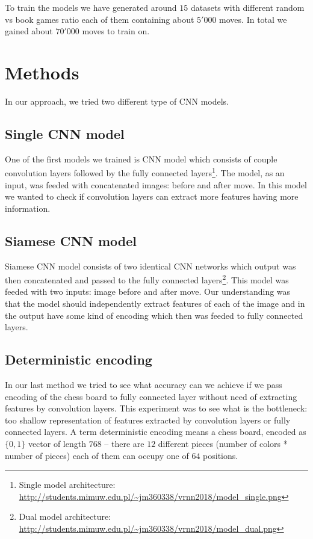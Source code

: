 \documentclass[10pt,twocolumn,letterpaper]{article}
\begin{document}
To train the models we have generated around $15$ datasets with different random
vs book games ratio each of them containing about $5'000$ moves. In total we
gained about $70'000$ moves to train on.

\section{Methods}

In our approach, we tried two different type of CNN models.

\subsection{Single CNN model}

One of the first models we trained is CNN model which consists of couple
convolution layers followed by the fully connected layers\footnote{Single model
architecture:
\url{http://students.mimuw.edu.pl/~jm360338/vrnn2018/model_single.png}}. The
model, as an input, was feeded with concatenated images: before and after move.
In this model we wanted to check if convolution layers can extract more features
having more information.

\subsection{Siamese CNN model}

Siamese CNN model consists of two identical CNN networks which output was then
concatenated and passed to the fully connected layers\footnote{Dual model
architecture:
\url{http://students.mimuw.edu.pl/~jm360338/vrnn2018/model_dual.png}}. This
model was feeded with two inputs: image before and after move. Our understanding
was that the model should independently extract features of each of the image
and in the output have some kind of encoding which then was feeded to fully
connected layers.

\subsection{Deterministic encoding}

In our last method we tried to see what accuracy can we achieve if we pass
encoding of the chess board to fully connected layer without need of extracting
features by convolution layers. This experiment was to see what is the
bottleneck: too shallow representation of features extracted by convolution
layers or fully connected layers. A term deterministic encoding means a chess
board, encoded as $\{0,1\}$ vector of length $768$ -- there are $12$ different
pieces (number of colors * number of pieces) each of them can occupy one of $64$
positions.
\end{document}

